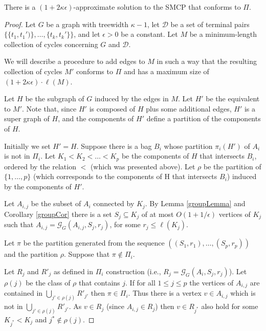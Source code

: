 \begin{theorem}\label{conformingPi}

There is a \((1 + 2 \kappa \epsilon)\)-approximate solution to the SMCP that conforms to \(\Pi\).

\end{theorem}
\begin{proof}

Let \(G\) be a graph with treewidth \(\kappa - 1\), let \(\mathcal{D}\) be a set of terminal pairs \(\{\{t_1, t_1')\}, \dots, \{t_k, t_k'\}\}\), and  let \(\epsilon > 0\) be a constant.
Let \(M\) be a minimum-length collection of cycles concerning \(G\) and \(\mathcal{D}\).

We will describe a procedure to add edges to \(M\) in such a way that the resulting collection of cycles \(M'\) conforms to \(\Pi\) and has a maximum size of \((1 + 2\kappa \epsilon ) \cdot \ell(M)\).

Let \(H\) be the subgraph of \(G\) induced by the edges in \(M\). Let \(H'\) be the equivalent to \(M'\). Note that, since \(H'\) is composed of \(H\) plus some additional edges, \(H'\) is a super graph of \(H\), and the components of \(H'\) define a partition of the components of \(H\).

Initially we set \(H' = H\). Suppose there is a bag \(B_i\) whose partition \(\pi_i(H')\) of \(A_i\) is not in \(\Pi_i\). Let \(K_1 < K_2 < \dots < K_p\) be the components of \(H\) that intersects \(B_i\), ordered by the relation \(<\) (which was presented above). Let \(\rho\) be the partition of \(\{1, \dots, p\}\) (which corresponds to the components of H that intersects \(B_i\)) induced by the components of \(H'\).

Let \(A_{i, j}\) be the subset of \(A_i\) connected by \(K_j\). By Lemma \ref{groupLemma} and Corollary \ref{groupCor} there is a set \(S_j \subseteq K_j\) of at most \(O(1 + 1/\epsilon)\) vertices of \(K_j\) such that \(A_{i,j} = \mathcal{G}_G(A_{i,j}, S_j, r_j)\), for some \(r_j \leq \ell(K_j)\).

Let \(\pi\) be the partition generated from the sequence \(((S_1, r_1), \dots, (S_p, r_p))\) and the partition \(\rho\).  
Suppose that \(\pi \notin \Pi_i\).

Let \(R_j\) and \(R'_j\) as defined in \(\Pi_i\) construction (i.e., \(R_j = \mathcal{G}_G(A_i, S_j, r_j)\)). Let \(\rho(j)\) be the class of \(\rho\) that contains \(j\). If for all \(1 \leq j \leq p\)  the vertices of \(A_{i,j}\) are contained in \(\bigcup_{j' \in \rho(j)}R'_{j'}\) then \(\pi \in \Pi_i\).
Thus there is a vertex \(v \in A_{i,j}\) which is not in \(\bigcup_{j' \in \rho(j)}R'_{j'}\). As \(v \in R_j\) (since \(A_{i,j} \in R_j\)) then \(v \in R_{j^\ast}\) also hold for some \(K_{j^\ast} < K_j\) and \(j^\ast \not\in \rho(j)\).


\end{proof}
